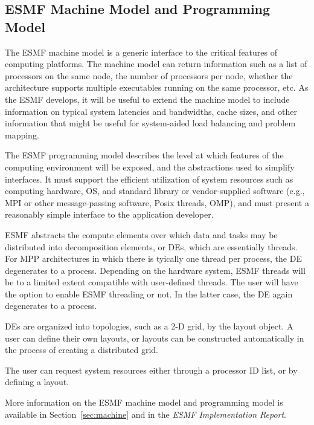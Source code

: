 \subsection{ESMF Machine Model and Programming Model}

The ESMF machine model is a generic interface to the critical features of 
computing platforms.  The machine model can return information
such as a list of processors on the same node, the number of processors
per node, whether the architecture supports multiple executables 
running on the same processor, etc.  As the ESMF develops, it will be useful
to extend the machine model to include information on typical system
latencies and bandwidths, cache sizes, and other information that 
might be useful for system-aided load balancing and problem mapping.

The ESMF programming model describes the level at which features of the 
computing environment will be exposed, and the abstractions used to 
simplify interfaces.  It must support the 
efficient utilization of system resources such as   
computing hardware, OS, and standard library or vendor-supplied 
software (e.g., MPI or other message-passing software, Posix threads, OMP),
and must present a reasonably simple interface to the application 
developer.

ESMF abstracts the compute elements over which data and tasks may be
distributed into decomposition elements, or DEs, which
are essentially threads.  For MPP architectures in which there
is tyically one thread per process, the DE degenerates to a process.
Depending on the hardware system, ESMF threads will be to a limited 
extent compatible with user-defined threads.  The user will have 
the option to enable ESMF threading or not.  In the latter case, the
DE again degenerates to a process.

DEs are organized into topologies, such as a 2-D grid, by the layout 
object.  A user can define their own layouts, or layouts can be 
constructed automatically in the process of creating a distributed 
grid.

The user can request system resources either through a processor
ID list, or by defining a layout.

More information on the ESMF machine model and programming model
is available in Section~\ref{sec:machine} and in the {\it ESMF
Implementation Report}.







